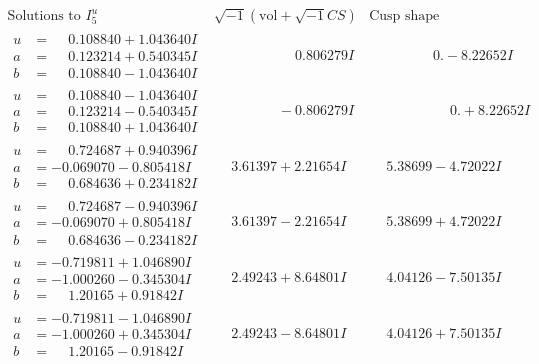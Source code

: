 \documentclass[1p]{elsarticle_modified}
\theoremstyle{definition}
\newcommand{\I}{\sqrt{-1}}
\begin{document}
$$\begin{array}{c|c|c}  
\text{Solutions to }I^u_{5}& \I (\text{vol} + \sqrt{-1}CS) & \text{Cusp shape}\\
 \hline 
\begin{aligned}
u &= \phantom{-}0.108840 + 1.043640 I \\
a &= \phantom{-}0.123214 + 0.540345 I \\
b &= \phantom{-}0.108840 - 1.043640 I\end{aligned}
 & \phantom{-0.000000 -}0.806279 I & \phantom{-0.000000 } 0. - 8.22652 I \\ \hline\begin{aligned}
u &= \phantom{-}0.108840 - 1.043640 I \\
a &= \phantom{-}0.123214 - 0.540345 I \\
b &= \phantom{-}0.108840 + 1.043640 I\end{aligned}
 & \phantom{-0.000000 } -0.806279 I & \phantom{-0.000000 -}0. + 8.22652 I \\ \hline\begin{aligned}
u &= \phantom{-}0.724687 + 0.940396 I \\
a &= -0.069070 - 0.805418 I \\
b &= \phantom{-}0.684636 + 0.234182 I\end{aligned}
 & \phantom{-}3.61397 + 2.21654 I & \phantom{-}5.38699 - 4.72022 I \\ \hline\begin{aligned}
u &= \phantom{-}0.724687 - 0.940396 I \\
a &= -0.069070 + 0.805418 I \\
b &= \phantom{-}0.684636 - 0.234182 I\end{aligned}
 & \phantom{-}3.61397 - 2.21654 I & \phantom{-}5.38699 + 4.72022 I \\ \hline\begin{aligned}
u &= -0.719811 + 1.046890 I \\
a &= -1.000260 - 0.345304 I \\
b &= \phantom{-}1.20165 + 0.91842 I\end{aligned}
 & \phantom{-}2.49243 + 8.64801 I & \phantom{-}4.04126 - 7.50135 I \\ \hline\begin{aligned}
u &= -0.719811 - 1.046890 I \\
a &= -1.000260 + 0.345304 I \\
b &= \phantom{-}1.20165 - 0.91842 I\end{aligned}
 & \phantom{-}2.49243 - 8.64801 I & \phantom{-}4.04126 + 7.50135 I \\ \hline\begin{aligned}

\end{aligned}
\end{array}$$
\end{document}
